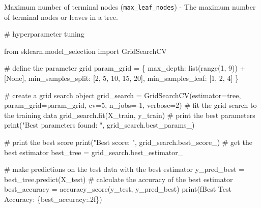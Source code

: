\documentclass[
  letterpaper,
  DIV=11,
  numbers=noendperiod]{scrreprt}
\newenvironment{Shaded}{\begin{snugshade}}{\end{snugshade}}
\newcommand{\BuiltInTok}[1]{\textcolor[rgb]{0.00,0.23,0.31}{#1}}
\newcommand{\CommentTok}[1]{\textcolor[rgb]{0.37,0.37,0.37}{#1}}
\newcommand{\DecValTok}[1]{\textcolor[rgb]{0.68,0.00,0.00}{#1}}
\newcommand{\ImportTok}[1]{\textcolor[rgb]{0.00,0.46,0.62}{#1}}
\newcommand{\NormalTok}[1]{\textcolor[rgb]{0.00,0.23,0.31}{#1}}
\newcommand{\OperatorTok}[1]{\textcolor[rgb]{0.37,0.37,0.37}{#1}}
\newcommand{\SpecialCharTok}[1]{\textcolor[rgb]{0.37,0.37,0.37}{#1}}
\newcommand{\SpecialStringTok}[1]{\textcolor[rgb]{0.13,0.47,0.30}{#1}}
\newcommand{\StringTok}[1]{\textcolor[rgb]{0.13,0.47,0.30}{#1}}
\newcommand{\VariableTok}[1]{\textcolor[rgb]{0.07,0.07,0.07}{#1}}
\begin{document}
Maximum number of terminal nodes (\texttt{max\_leaf\_nodes}) - The
maximum number of terminal nodes or leaves in a tree.

\begin{Shaded}
\begin{Highlighting}[]
\CommentTok{\# hyperparameter tuning}

\ImportTok{from}\NormalTok{ sklearn.model\_selection }\ImportTok{import}\NormalTok{ GridSearchCV}

\CommentTok{\# define the parameter grid}
\NormalTok{param\_grid }\OperatorTok{=}\NormalTok{ \{}
    \StringTok{\textquotesingle{}max\_depth\textquotesingle{}}\NormalTok{: }\BuiltInTok{list}\NormalTok{(}\BuiltInTok{range}\NormalTok{(}\DecValTok{1}\NormalTok{, }\DecValTok{9}\NormalTok{)) }\OperatorTok{+}\NormalTok{ [}\VariableTok{None}\NormalTok{], }
    \StringTok{\textquotesingle{}min\_samples\_split\textquotesingle{}}\NormalTok{: [}\DecValTok{2}\NormalTok{, }\DecValTok{5}\NormalTok{, }\DecValTok{10}\NormalTok{, }\DecValTok{15}\NormalTok{, }\DecValTok{20}\NormalTok{],}
    \StringTok{\textquotesingle{}min\_samples\_leaf\textquotesingle{}}\NormalTok{: [}\DecValTok{1}\NormalTok{, }\DecValTok{2}\NormalTok{, }\DecValTok{4}\NormalTok{]}
\NormalTok{\}}

\CommentTok{\# create a grid search object}
\NormalTok{grid\_search }\OperatorTok{=}\NormalTok{ GridSearchCV(estimator}\OperatorTok{=}\NormalTok{tree, param\_grid}\OperatorTok{=}\NormalTok{param\_grid, cv}\OperatorTok{=}\DecValTok{5}\NormalTok{, n\_jobs}\OperatorTok{={-}}\DecValTok{1}\NormalTok{, verbose}\OperatorTok{=}\DecValTok{2}\NormalTok{)}
\CommentTok{\# fit the grid search to the training data}
\NormalTok{grid\_search.fit(X\_train, y\_train)}
\CommentTok{\# print the best parameters}
\BuiltInTok{print}\NormalTok{(}\StringTok{"Best parameters found: "}\NormalTok{, grid\_search.best\_params\_)}

\CommentTok{\# print the best score}
\BuiltInTok{print}\NormalTok{(}\StringTok{"Best score: "}\NormalTok{, grid\_search.best\_score\_)}
\CommentTok{\# get the best estimator}
\NormalTok{best\_tree }\OperatorTok{=}\NormalTok{ grid\_search.best\_estimator\_}

\CommentTok{\# make predictions on the test data with the best estimator}
\NormalTok{y\_pred\_best }\OperatorTok{=}\NormalTok{ best\_tree.predict(X\_test)}
\CommentTok{\# calculate the accuracy of the best estimator}
\NormalTok{best\_accuracy }\OperatorTok{=}\NormalTok{ accuracy\_score(y\_test, y\_pred\_best)}
\BuiltInTok{print}\NormalTok{(}\SpecialStringTok{f\textquotesingle{}Best Test Accuracy: }\SpecialCharTok{\{}\NormalTok{best\_accuracy}\SpecialCharTok{:.2f\}}\SpecialStringTok{\textquotesingle{}}\NormalTok{)}
\end{Highlighting}
\end{Shaded}
\end{document}
